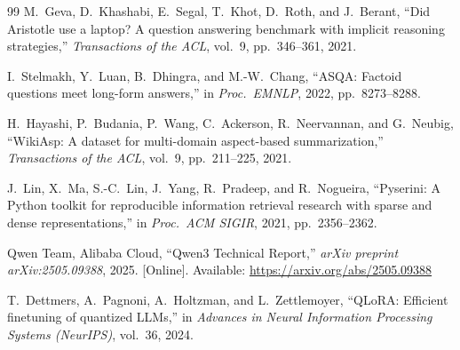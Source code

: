 \documentclass[conference]{IEEEtran}
\begin{document}
\begin{thebibliography}{99}
M.~Geva, D.~Khashabi, E.~Segal, T.~Khot, D.~Roth, and J.~Berant,
``Did Aristotle use a laptop? A question answering benchmark with
  implicit reasoning strategies,''
\emph{Transactions of the ACL}, vol.~9, pp.\ 346--361, 2021.

I.~Stelmakh, Y.~Luan, B.~Dhingra, and M.-W.~Chang,
``ASQA: Factoid questions meet long-form answers,''
in \emph{Proc.\ EMNLP}, 2022, pp.\ 8273--8288.

H.~Hayashi, P.~Budania, P.~Wang, C.~Ackerson, R.~Neervannan, and
G.~Neubig,
``WikiAsp: A dataset for multi-domain aspect-based summarization,''
\emph{Transactions of the ACL}, vol.~9, pp.\ 211--225, 2021.

J.~Lin, X.~Ma, S.-C.~Lin, J.~Yang, R.~Pradeep, and R.~Nogueira,
``Pyserini: A Python toolkit for reproducible information retrieval
  research with sparse and dense representations,''
in \emph{Proc.\ ACM SIGIR}, 2021, pp.\ 2356--2362.

Qwen Team, Alibaba Cloud,
``Qwen3 Technical Report,''
\emph{arXiv preprint arXiv:2505.09388}, 2025.
[Online]. Available: \url{https://arxiv.org/abs/2505.09388}

T.~Dettmers, A.~Pagnoni, A.~Holtzman, and L.~Zettlemoyer,
``QLoRA: Efficient finetuning of quantized LLMs,''
in \emph{Advances in Neural Information Processing Systems (NeurIPS)},
vol.~36, 2024.

\end{thebibliography}

\balance
\end{document}
